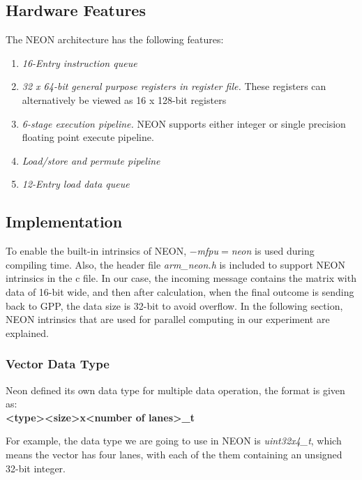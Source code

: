 \subsection{Hardware Features}
The NEON architecture has the following features\cite{hardware}:
\begin{enumerate}
\item \emph{16-Entry instruction queue}
\item \emph{32 x 64-bit general purpose registers in register file.}
These registers can alternatively be viewed as 16 x 128-bit registers
\item \emph{6-stage execution pipeline.}
NEON supports either integer or single precision floating point execute pipeline.
\item \emph{Load/store and permute pipeline}
\item \emph{12-Entry load data queue}
\end{enumerate}

\subsection{Implementation}
To enable the built-in intrinsics of NEON, 
\emph{$-$mfpu$=$neon}\cite{ARMoptions} is used during compiling time.
Also, the header file \emph{arm\_neon.h} is included 
to support NEON intrinsics in the c file.
In our case, the incoming message contains the matrix with data of 16-bit wide, 
and then after calculation, when the final outcome is sending back to GPP, the data size is 32-bit to avoid overflow.
In the following section, NEON intrinsics that are used for parallel computing in our experiment are explained.

\subsubsection{Vector Data Type}
Neon defined its own data type\cite{DataType} for multiple data operation, the format is given as:
~\\ 
\textbf{ \textless type\textgreater \textless size\textgreater x\textless number of lanes\textgreater\_t}

For example, the data type we are going to use in NEON is \emph{uint32x4\_t}, 
which means the vector has four lanes, 
with each of the them containing an unsigned 32-bit integer. 

